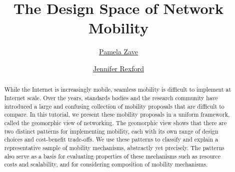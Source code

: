 \documentclass{article}
\title{The Design Space of Network Mobility}
\author{
\href{http://www2.research.att.com/~pamela/}{Pamela Zave} \\
\and
\href{http://www.cs.princeton.edu/~jrex/}{Jennifer Rexford} \\
}
\date{}
\begin{document}
\copyrightstatement

\pagestyle{empty}

\maketitle

\thispagestyle{empty}

\begin{abstract}
While the Internet is increasingly mobile, seamless mobility is
difficult to implement at Internet scale.  Over the years, standards
bodies and the research community have introduced a large and
confusing collection of mobility proposals that are difficult to
compare.  In this tutorial, we present these mobility proposals
in a uniform framework, called the geomorphic view of networking.
The geomorphic view shows that there are two distinct patterns
for implementing mobility, each with its own range of 
design choices and cost-benefit trade-offs.
We use these patterns to classify and explain
a representative sample of mobility
mechanisms, abstractly yet precisely.
The patterns also serve as a basis for evaluating properties of
these mechanisms such as resource costs and scalability,
and for considering composition of mobility mechanisms.
\end{abstract}



















%


\end{document}
